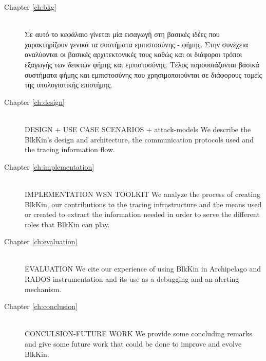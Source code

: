 \begin{description} \item[Chapter \ref{ch:bkg}] \hfill \\
Σε αυτό το κεφάλαιο γίνεται μία εισαγωγή στη βασικές ιδέες που χαρακτηρίζουν γενικά τα συστήματα εμπιστοσύνης - φήμης. Στην συνέχεια αναλύονται οι βασικές αρχιτεκτονικές τους καθώς και οι διάφοροι τρόποι εξαγωγής των δεικτών φήμης και εμπιστοσύνης. Τέλος παρουσιάζονται βασικά συστήματα φήμης και εμπιστοσύνης που χρησιμοποιούνται σε διάφορους τομείς της υπολογιστικής επιστήμης.

\item[Chapter \ref{ch:design}] \hfill \\
DESIGN + USE CASE SCENARIOS + attack-models
We describe the BlkKin's design and architecture, the communication protocols
used and the tracing information flow.

\item[Chapter \ref{ch:implementation}] \hfill \\
IMPLEMENTATION WSN TOOLKIT
We analyze the process of creating BlkKin, our contributions to the tracing
infrastructure and the means used or created to extract the information needed
in order to serve the different roles that BlkKin can play.

\item[Chapter \ref{ch:evaluation}] \hfill \\
EVALUATION
We cite our experience of using BlkKin in Archipelago and RADOS instrumentation
and its use as a debugging and an alerting mechanism.

\item[Chapter \ref{ch:conclusion}] \hfill \\
CONCULSION-FUTURE WORK
We provide some concluding remarks and give some future work that could be done
to improve and evolve BlkKin.
\end{description}
